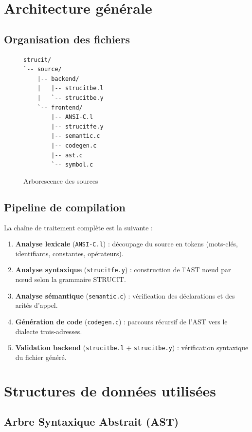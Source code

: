 \documentclass[12pt,a4paper]{article}
\begin{document}
\section{Architecture générale}

\subsection{Organisation des fichiers}

\begin{figure}[H]
\centering
\begin{BVerbatim}
strucit/
`-- source/
    |-- backend/
    |   |-- strucitbe.l
    |   `-- strucitbe.y
    `-- frontend/
        |-- ANSI-C.l
        |-- strucitfe.y
        |-- semantic.c
        |-- codegen.c
        |-- ast.c
        `-- symbol.c
\end{BVerbatim}
\caption{Arborescence des sources}
\end{figure}

\subsection{Pipeline de compilation}

La chaîne de traitement complète est la suivante :

\begin{enumerate}
  \item \textbf{Analyse lexicale} (\texttt{ANSI-C.l}) : découpage du source en tokens (mots-clés, identifiants, constantes, opérateurs).
  \item \textbf{Analyse syntaxique} (\texttt{strucitfe.y}) : construction de l'AST nœud par nœud selon la grammaire STRUCIT.
  \item \textbf{Analyse sémantique} (\texttt{semantic.c}) : vérification des déclarations et des arités d'appel.
  \item \textbf{Génération de code} (\texttt{codegen.c}) : parcours récursif de l'AST vers le dialecte trois-adresses.
  \item \textbf{Validation backend} (\texttt{strucitbe.l} + \texttt{strucitbe.y}) : vérification syntaxique du fichier généré.
\end{enumerate}

\section{Structures de données utilisées}

\subsection{Arbre Syntaxique Abstrait (AST)}
\end{document}
